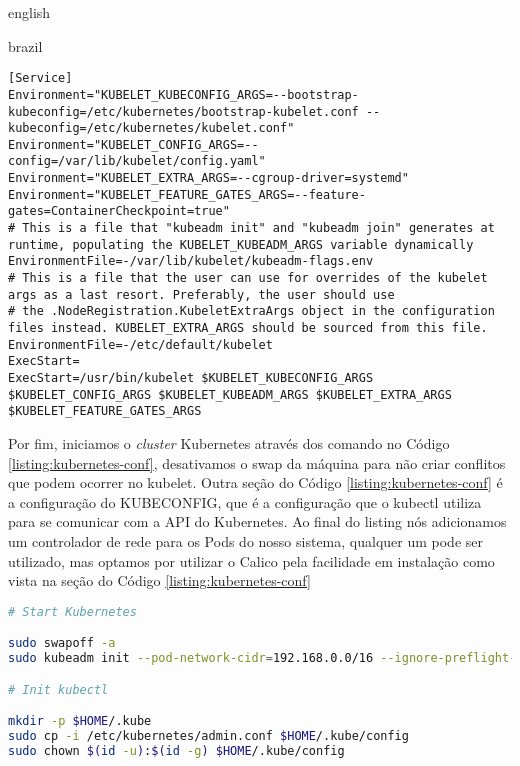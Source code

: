\begin{otherlanguage*}{english}
\begin{otherlanguage*}{brazil}
\begin{lstlisting}[language=plaintext,caption={Configuração do kubelet para executar no systemd com Feature Flag de ContainerCheckpoint e cgroup do systemd.},label={listing:kubelet-conf}]
[Service]
Environment="KUBELET_KUBECONFIG_ARGS=--bootstrap-kubeconfig=/etc/kubernetes/bootstrap-kubelet.conf --kubeconfig=/etc/kubernetes/kubelet.conf"
Environment="KUBELET_CONFIG_ARGS=--config=/var/lib/kubelet/config.yaml"
Environment="KUBELET_EXTRA_ARGS=--cgroup-driver=systemd"
Environment="KUBELET_FEATURE_GATES_ARGS=--feature-gates=ContainerCheckpoint=true"
# This is a file that "kubeadm init" and "kubeadm join" generates at runtime, populating the KUBELET_KUBEADM_ARGS variable dynamically
EnvironmentFile=-/var/lib/kubelet/kubeadm-flags.env
# This is a file that the user can use for overrides of the kubelet args as a last resort. Preferably, the user should use
# the .NodeRegistration.KubeletExtraArgs object in the configuration files instead. KUBELET_EXTRA_ARGS should be sourced from this file.
EnvironmentFile=-/etc/default/kubelet
ExecStart=
ExecStart=/usr/bin/kubelet $KUBELET_KUBECONFIG_ARGS $KUBELET_CONFIG_ARGS $KUBELET_KUBEADM_ARGS $KUBELET_EXTRA_ARGS $KUBELET_FEATURE_GATES_ARGS
\end{lstlisting}

Por fim, iniciamos o \textit{cluster} Kubernetes através dos comando no Código
\ref{listing:kubernetes-conf}, desativamos o swap da máquina para não criar conflitos que podem
ocorrer no kubelet. Outra seção do Código \ref{listing:kubernetes-conf} é a configuração do
KUBECONFIG, que é a configuração que o kubectl utiliza para se comunicar com a API do Kubernetes.
Ao final do listing nós adicionamos um controlador de rede para os Pods do nosso sistema, qualquer
um pode ser utilizado, mas optamos por utilizar o Calico \cite{calico} pela facilidade em
instalação como vista na seção do Código \ref{listing:kubernetes-conf}

\begin{lstlisting}[language=bash,caption={Inicialização do Kubernetes, configuração de acesso para o kubectl e instalação do administrador de rede para Pods Calico.},label={listing:kubernetes-conf}]
# Start Kubernetes

sudo swapoff -a
sudo kubeadm init --pod-network-cidr=192.168.0.0/16 --ignore-preflight-errors='all'

# Init kubectl

mkdir -p $HOME/.kube
sudo cp -i /etc/kubernetes/admin.conf $HOME/.kube/config
sudo chown $(id -u):$(id -g) $HOME/.kube/config


\end{lstlisting}
\end{otherlanguage*}
\end{otherlanguage*}
